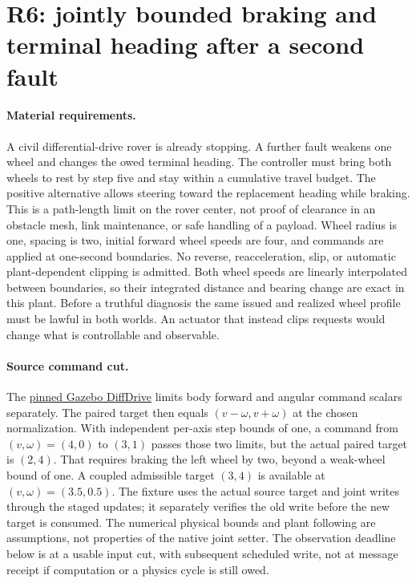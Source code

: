 \documentclass{article}
\begin{document}
\section*{R6: jointly bounded braking and terminal heading after a second fault}
\paragraph{Material requirements.}
A civil differential-drive rover is already stopping. A further
fault weakens one wheel and changes the owed terminal heading.
The controller must bring both wheels to rest by step five and
stay within a cumulative travel budget. The positive alternative
allows steering toward the replacement heading while braking.
This is a path-length limit on the rover center, not proof of
clearance in an obstacle mesh, link maintenance, or safe handling
of a payload. Wheel radius is one, spacing is two, initial forward
wheel speeds are four, and commands are applied at one-second
boundaries. No reverse, reacceleration, slip, or automatic
plant-dependent clipping is admitted. Both wheel speeds are
linearly interpolated between boundaries, so their integrated
distance and bearing change are exact in this plant. Before a
truthful diagnosis the same issued and realized wheel profile must
be lawful in both worlds. An actuator that instead clips requests
would change what is controllable and observable.

\paragraph{Source command cut.}
The \href{https://github.com/gazebosim/gz-sim/blob/9b1151a9c1f5fe6d1af4c6e0d33d1f0992e8a811/src/systems/diff_drive/DiffDrive.cc}{pinned Gazebo DiffDrive}
limits body forward and angular command scalars separately.
The paired target then equals \((v-\omega,v+\omega)\) at the chosen
normalization. With independent per-axis step bounds of one, a
command from \((v,\omega)=(4,0)\) to \((3,1)\) passes those two
limits, but the actual paired target is \((2,4)\). That requires
braking the left wheel by two, beyond a weak-wheel bound of one.
A coupled admissible target \((3,4)\) is available at
\((v,\omega)=(3.5,0.5)\). The fixture uses the actual source target
and joint writes through the staged updates; it separately verifies
the old write before the new target is consumed. The numerical
physical bounds and plant following are assumptions, not properties
of the native joint setter. The observation deadline below is at a
usable input cut, with subsequent scheduled write, not at message
receipt if computation or a physics cycle is still owed.
\end{document}

